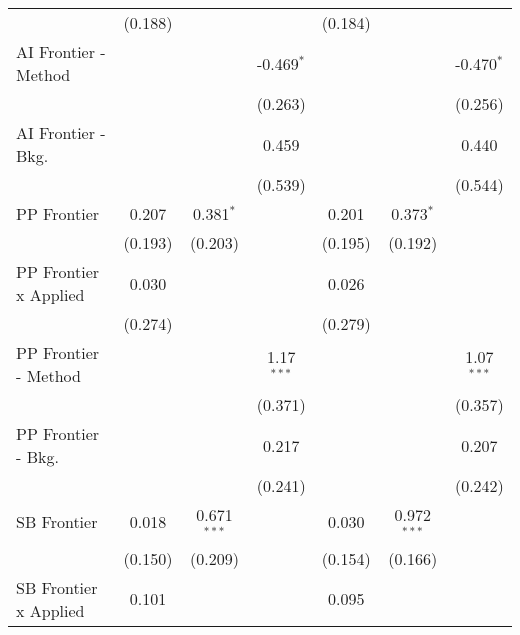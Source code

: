 \begin{tabular}{lcccccc}
                                & (0.188)        &               &               & (0.184)        &               &   \\   
   AI Frontier - Method         &                &               & -0.469$^{*}$  &                &               & -0.470$^{*}$\\   
                                &                &               & (0.263)       &                &               & (0.256)\\   
   AI Frontier - Bkg.           &                &               & 0.459         &                &               & 0.440\\   
                                &                &               & (0.539)       &                &               & (0.544)\\   
   PP Frontier                  & 0.207          & 0.381$^{*}$   &               & 0.201          & 0.373$^{*}$   &   \\   
                                & (0.193)        & (0.203)       &               & (0.195)        & (0.192)       &   \\   
   PP Frontier x Applied        & 0.030          &               &               & 0.026          &               &   \\   
                                & (0.274)        &               &               & (0.279)        &               &   \\   
   PP Frontier - Method         &                &               & 1.17$^{***}$  &                &               & 1.07$^{***}$\\   
                                &                &               & (0.371)       &                &               & (0.357)\\   
   PP Frontier - Bkg.           &                &               & 0.217         &                &               & 0.207\\   
                                &                &               & (0.241)       &                &               & (0.242)\\   
   SB Frontier                  & 0.018          & 0.671$^{***}$ &               & 0.030          & 0.972$^{***}$ &   \\   
                                & (0.150)        & (0.209)       &               & (0.154)        & (0.166)       &   \\   
   SB Frontier x Applied        & 0.101          &               &               & 0.095          &               &   \\   

\end{tabular}
